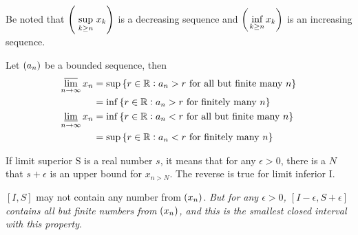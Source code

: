 Be noted that $\sequence{\underset{k \geq n}{\text{ sup }} x_k}$ is a decreasing sequence and $\sequence{\underset{k \geq n}{\text{ inf }} x_k}$ is an increasing sequence.


\begin{theorem}\label{definition_of_limit_superium_infinium}
    Let $\sequence{a_n}$ be a bounded sequence, then
    \begin{equation}
        \begin{aligned}
            \varlimsup_{n\rightarrow \infty} x_n &= \sup \set{r \in \mathbb{R}: a_n > r \text{ for all but finite many } n} \\
            &= \inf \set{r \in \mathbb{R}: a_n > r \text{ for finitely many } n} \\
            \varliminf_{n\rightarrow \infty} x_n &= \inf \set{r \in \mathbb{R}: a_n < r \text{ for all but finite many } n} \\
            &= \sup \set{r \in \mathbb{R}: a_n < r \text{ for finitely many } n} 
        \end{aligned}
    \end{equation}

    
    If limit superior S is a real number $s$, it means that for any $\epsilon>0$, there is a $N$ that $s + \epsilon$ is an upper bound for $x_{n > N}$. The reverse is true for limit inferior I.

    $[I,S]$ may not contain any number from $\sequence{x_n}$. \emph{But for any $\epsilon >0$, $[I - \epsilon, S + \epsilon]$ contains all but finite numbers from $\sequence{x_n}$, and this is the smallest closed interval with this property}.
\end{theorem}


